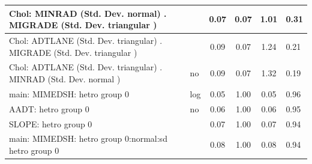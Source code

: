 \begin{table}
\begin{center}
\begin{tabular}{|l|l|c|c|c|l|}
			\hline
			 Chol: MINRAD (Std. Dev. normal) . MIGRADE (Std. Dev.   triangular ) &  & 0.07 & 0.07 & 1.01 & 0.31 \\
			\hline
			 Chol: ADTLANE (Std. Dev. triangular) . MIGRADE (Std. Dev.   triangular ) &  & 0.09 & 0.07 & 1.24 & 0.21 \\
			\hline
			 Chol: ADTLANE (Std. Dev. triangular) . MINRAD (Std. Dev.   normal ) & no & 0.09 & 0.07 & 1.32 & 0.19 \\
			\hline
			main: MIMEDSH: hetro group 0 & log & 0.05 & 1.00 & 0.05 & 0.96 \\
			\hline
			AADT: hetro group 0 & no & 0.06 & 1.00 & 0.06 & 0.95 \\
			\hline
			SLOPE: hetro group 0 &  & 0.07 & 1.00 & 0.07 & 0.94 \\
			\hline
			main: MIMEDSH: hetro group 0:normal:sd  hetro group 0 &  & 0.08 & 1.00 & 0.08 & 0.94 \\
			\hline
		\end{tabular}
	\end{center}
\end{table}